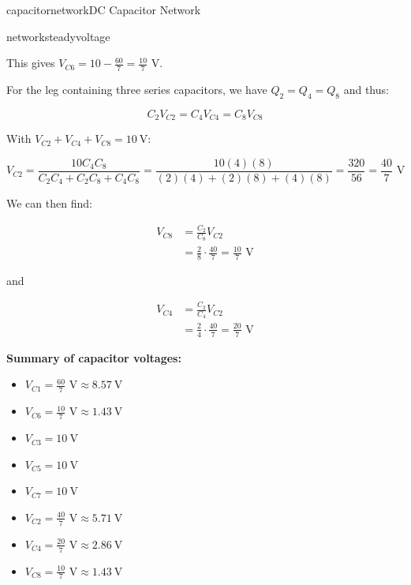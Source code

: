 \begin{mainquestion}{capacitornetwork}{DC Capacitor Network}
\begin{partquestion}{networksteadyvoltage}
\begin{answer}
This gives $V_{C6} = 10 - \frac{60}{7} = \frac{10}{7}\text{ V}$.

For the leg containing three series capacitors, we have $Q_2 = Q_4 = Q_8$ and thus:

\[
C_2 V_{C2} = C_4 V_{C4} = C_8 V_{C8}
\]

With $V_{C2} + V_{C4} + V_{C8} = \qty{10}{\volt}$:

\[
V_{C2} = \frac{10 C_4 C_8}{C_2 C_4 + C_2 C_8 + C_4 C_8} = \frac{10(4)(8)}{(2)(4) + (2)(8) + (4)(8)} = \frac{320}{56} = \frac{40}{7}\text{ V}
\]

We can then find:

\begin{align*}
V_{C8} &= \frac{C_2}{C_8}V_{C2} \\
&= \frac{2}{8}\cdot\frac{40}{7} = \frac{10}{7}\text{ V}
\end{align*}

and

\begin{align*}
V_{C4} &= \frac{C_2}{C_4}V_{C2} \\
&= \frac{2}{4}\cdot\frac{40}{7} = \frac{20}{7}\text{ V}
\end{align*}

\textbf{Summary of capacitor voltages:}
\begin{itemize}
  \item $V_{C1} = \frac{60}{7}\text{ V} \approx \qty{8.57}{\volt}$
  \item $V_{C6} = \frac{10}{7}\text{ V} \approx \qty{1.43}{\volt}$
  \item $V_{C3} = \qty{10}{\volt}$
  \item $V_{C5} = \qty{10}{\volt}$
  \item $V_{C7} = \qty{10}{\volt}$
  \item $V_{C2} = \frac{40}{7}\text{ V} \approx \qty{5.71}{\volt}$ 
  \item $V_{C4} = \frac{20}{7}\text{ V} \approx \qty{2.86}{\volt}$
  \item $V_{C8} = \frac{10}{7}\text{ V} \approx \qty{1.43}{\volt}$
\end{itemize}

\end{answer}
\end{partquestion}

\end{mainquestion}
